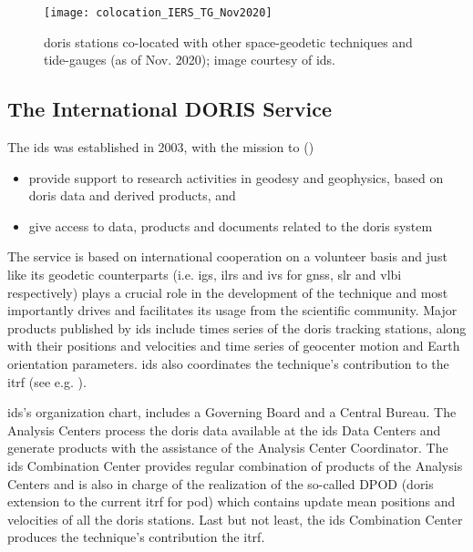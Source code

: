 \begin{figure}[h]
  \centering
  \texttt{[image: colocation\_IERS\_TG\_Nov2020]}
  \caption{\gls{doris} stations co-located with other space-geodetic techniques 
    and tide-gauges (as of Nov. 2020); image courtesy of \gls{ids}.}
  \label{fig:doris-network-ties}
\end{figure}

\subsection{The International DORIS Service}\label{ssec:ids}
The \gls{ids} was established in 2003, with the mission to (\cite{Soudarin2019})
\begin{itemize}
  \item provide support to research activities in geodesy and geophysics, based 
    on \gls{doris} data and derived products, and
  \item give access to data, products and documents related to the \gls{doris} system
\end{itemize}

The service is based on international cooperation on a volunteer basis and just like 
its geodetic counterparts (i.e. \gls{igs}, \gls{ilrs} and \gls{ivs} for \gls{gnss}, 
\gls{slr} and \gls{vlbi} respectively) plays a crucial role in the development of 
the technique and most importantly drives and facilitates its usage from the scientific 
community. Major products published by \gls{ids} include times series of the \gls{doris} 
tracking stations, along with their positions and velocities  and time series of 
geocenter motion and Earth orientation parameters. \gls{ids} also coordinates the 
technique's contribution to the \gls{itrf} (see e.g. \cite{Moreaux2022}).

\gls{ids}'s organization chart, includes a Governing Board and a Central Bureau.
The Analysis Centers process the \gls{doris} data available at the \gls{ids} Data 
Centers and generate products with the assistance of the Analysis Center Coordinator.
The \gls{ids} Combination Center provides regular combination of products of 
the Analysis Centers and is also in charge of the realization of the so-called 
DPOD (\gls{doris} extension to the current \gls{itrf} for \gls{pod}) 
which contains update mean positions and velocities of all the \gls{doris} stations. 
Last but not least, the \gls{ids} Combination Center produces the technique's 
contribution the \gls{itrf}.

\iffalse
\fi
